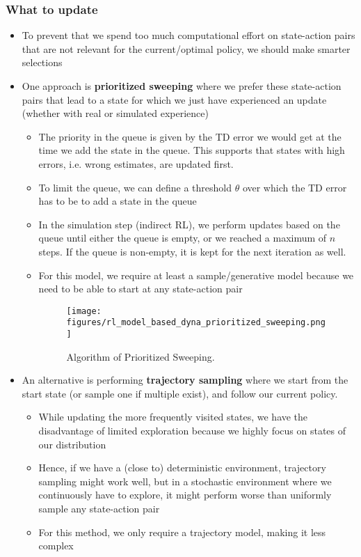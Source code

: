 \subsubsection{What to update}
\begin{itemize}
	\item To prevent that we spend too much computational effort on state-action pairs that are not relevant for the current/optimal policy, we should make smarter selections
	\item One approach is \textbf{prioritized sweeping} where we prefer these state-action pairs that lead to a state for which we just have experienced an update (whether with real or simulated experience)
	\begin{itemize}
		\item The priority in the queue is given by the TD error we would get at the time we add the state in the queue. This supports that states with high errors, i.e. wrong estimates, are updated first.
		\item To limit the queue, we can define a threshold $\theta$ over which the TD error has to be to add a state in the queue
		\item In the simulation step (indirect RL), we perform updates based on the queue until either the queue is empty, or we reached a maximum of $n$ steps. If the queue is non-empty, it is kept for the next iteration as well.
		\item For this model, we require at least a sample/generative model because we need to be able to start at any state-action pair
		\begin{figure}[ht!]
			\centering
			\texttt{[image: figures/rl\_model\_based\_dyna\_prioritized\_sweeping.png]}
			\caption{Algorithm of Prioritized Sweeping.}
		\end{figure}
	\end{itemize}
	\item An alternative is performing \textbf{trajectory sampling} where we start from the start state (or sample one if multiple exist), and follow our current policy. 
	\begin{itemize}
		\item While updating the more frequently visited states, we have the disadvantage of limited exploration because we highly focus on states of our distribution
		\item Hence, if we have a (close to) deterministic environment, trajectory sampling might work well, but in a stochastic environment where we continuously have to explore, it might perform worse than uniformly sample any state-action pair 
		\item For this method, we only require a trajectory model, making it less complex
	\end{itemize}
\end{itemize}
